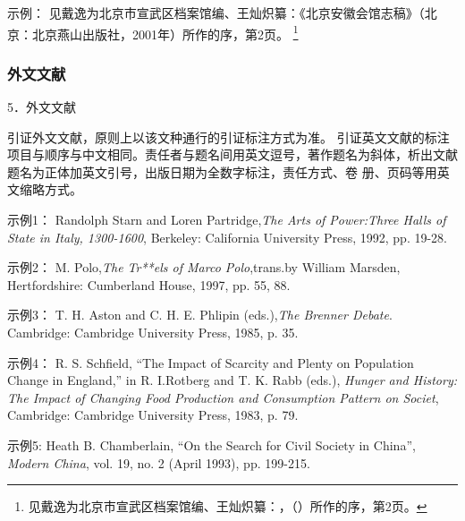 \documentclass{article}
\begin{document}
示例：
见戴逸为北京市宣武区档案馆编、王灿炽纂：《北京安徽会馆志稿》（北京：北京燕山出版社，2001年）所作的序，第2页。
\footnote{见戴逸为北京市宣武区档案馆编、王灿炽纂：，（）所作的序，第2页。}

\subsubsection{外文文献}
5．外文文献

引证外文文献，原则上以该文种通行的引证标注方式为准。
引证英文文献的标注项目与顺序与中文相同。责任者与题名间用英文逗号，著作题名为斜体，析出文献题名为正体加英文引号，出版日期为全数字标注，责任方式、卷
册、页码等用英文缩略方式。

示例1：
Randolph Starn and Loren Partridge,\textit{The Arts of Power:Three Halls of State in Italy, 1300-1600}, Berkeley: California University Press, 1992, pp. 19-28.

示例2：
M. Polo,\textit{The Tr**els of Marco Polo},trans.by William Marsden, Hertfordshire: Cumberland House, 1997, pp. 55, 88.

示例3：
T. H. Aston and C. H. E. Phlipin (eds.),\textit{The Brenner Debate}. Cambridge: Cambridge University Press, 1985, p. 35.

示例4：
R. S. Schfield, “The Impact of Scarcity and Plenty on Population Change in England,” in R. I.Rotberg and T. K. Rabb (eds.), \textit{Hunger and History: The Impact of Changing Food
Production and Consumption Pattern on Societ}, Cambridge: Cambridge University Press, 1983, p. 79.

示例5:
Heath B. Chamberlain, “On the Search for Civil Society in China”, \textit{Modern China}, vol. 19, no. 2 (April 1993), pp. 199-215.


\newpage
\printbibliography[heading=bibliography]
\end{document}
